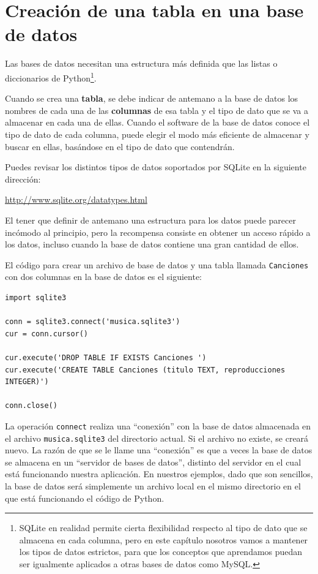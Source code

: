 \section{Creación de una tabla en una base de datos}

Las bases de datos necesitan una estructura más definida que las listas
o diccionarios de Python\footnote{SQLite en realidad permite cierta
flexibilidad respecto al tipo de dato que se almacena en cada columna,
pero en este capítulo nosotros vamos a mantener los tipos de datos estrictos,
para que los conceptos que aprendamos puedan ser igualmente aplicados a otras
bases de datos como MySQL.}.

Cuando se crea una {\bf tabla}, se debe
indicar de antemano a la base de datos los nombres de cada una de las
{\bf columnas} de esa tabla y el tipo de dato que se va a
almacenar en cada una de ellas. Cuando el software de la base de datos
conoce el tipo de dato de cada columna, puede elegir el modo más
eficiente de almacenar y buscar en ellas, basándose en el tipo de
dato que contendrán.

Puedes revisar los distintos tipos de datos soportados por SQLite
en la siguiente dirección:

\url{http://www.sqlite.org/datatypes.html}

El tener que definir de antemano una estructura para los datos puede parecer incómodo
al principio, pero la recompensa consiste en obtener un acceso rápido a los datos,
incluso cuando la base de datos contiene una gran cantidad de ellos.

El código para crear un archivo de base de datos y una tabla
llamada {\tt Canciones} con dos columnas en la
base de datos es el siguiente:

\beforeverb
\begin{verbatim}
import sqlite3

conn = sqlite3.connect('musica.sqlite3')
cur = conn.cursor()

cur.execute('DROP TABLE IF EXISTS Canciones ')
cur.execute('CREATE TABLE Canciones (titulo TEXT, reproducciones INTEGER)')

conn.close()
\end{verbatim}
\afterverb
%
La operación {\tt connect} realiza una ``conexión'' con la base de datos
almacenada en el archivo {\tt musica.sqlite3} del directorio actual. Si
el archivo no existe, se creará nuevo. La razón de que se le
llame una ``conexión'' es que a veces la base de datos se almacena en
un ``servidor de bases de datos'', distinto del servidor en el cual está
funcionando nuestra aplicación. En nuestros ejemplos, dado que son sencillos,
la base de datos será simplemente un archivo local en el mismo directorio
en el que está funcionando el código de Python.

